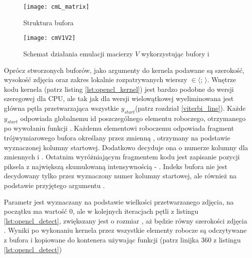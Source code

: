 \documentclass[document.tex]{subfiles}
\begin{document}
 

\begin{figure}[h]
\texttt{[image: cmL\_matrix]}
\caption{Struktura bufora }
\label{fig:cmL}
\end{figure}

\begin{figure}[h]
\texttt{[image: cmV1V2]}
\caption{Schemat działania emulacji macierzy $V$ wykorzystując bufory  i }
\label{fig:cmV1V2}
\end{figure}

\indent Oprócz stworzonych buforów, jako argumenty do kernela podawane są szerokość, wysokość zdjęcia oraz 
zakres lokalnie rozpatrywanych wierszy  $\in \langle$;  $\rangle$.
Wnętrze kodu kernela (patrz listing \ref{lst:opencl_kernel}) jest bardzo podobne do wersji szeregowej
dla CPU, ale tak jak dla wersji wielowątkowej wyeliminowana jest główna pętla przetwarzająca wszystkie
$y_{start}$(patrz rozdział \ref{viterbi_line}). Każde $y_{start}$ odpowiada globalnemu id poszczególnego
elementu roboczego, otrzymanego po wywołaniu funkcji .
Każdemu elementowi roboczemu odpowiada fragment trójwymiarowego bufora  określany przez zmienną
, otrzymany na podstawie wyznaczonej kolumny startowej. Dodatkowo decyduje ona
o numerze kolumny dla zmiennych  i . Ostatnim wyróżniającym fragmentem kodu jest zapisanie
pozycji piksela z największą skumulowaną intensywnością - . Indeks bufora  nie jest
decydowany tylko przez wyznaczony numer kolumny startowej, ale również na podstawie przyjętego argumentu
.

 


\indent Parametr  jest wyznaczany na podstawie wielkości przetwarzanego zdjęcia,
na początku ma wartość 0, ale w kolejnych iteracjach pętli z listingu \ref{lst:opencl_detect},
zwiększany jest o rozmiar , aż będzie równy szerokości zdjęcia .
Wyniki po wykonaniu kernela przez wszystkie elementy robocze są odczytywane z bufora  i 
kopiowane do kontenera  używając funkcji (patrz linijka 360 z listingu
\ref{lst:opencl_detect})

 
\end{document}
